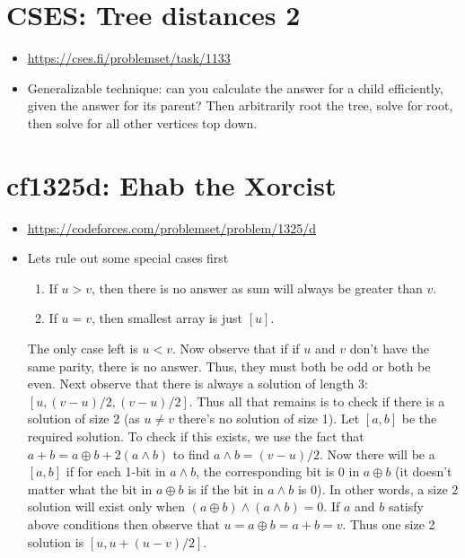 \documentclass[titlepage, 12pt]{book}
\begin{document}
\section{CSES: Tree distances 2}
\begin{itemize}
  \item \url{https://cses.fi/problemset/task/1133}
  \item Generalizable technique: can you calculate the answer for a child
    efficiently, given the answer for its parent? Then arbitrarily root the
    tree, solve for root, then solve for all other vertices top down.
\end{itemize}

\section{cf1325d: Ehab the Xorcist}
\begin{itemize}
  \item \url{https://codeforces.com/problemset/problem/1325/d}
  \item Lets rule out some special cases first
    \begin{enumerate}
      \item If $u > v$, then there is no answer as sum will always be greater
        than $v$.
      \item If $u = v$, then smallest array is just $[u]$.
    \end{enumerate}
    The only case left is $u < v$. Now observe that if if $u$ and $v$ don't have
    the same parity, there is no answer. Thus, they must both be odd or both be
    even. Next observe that there is always a solution of length 3: $[u, (v - u)
    / 2, (v - u) / 2]$. Thus all that remains is to check if there is a solution
    of size 2 (as $u\neq v$ there's no solution of size 1). Let $[a, b]$ be the
    required solution. To check if this exists, we use the fact that $a + b =
    a\oplus b + 2(a \land b)$ to find $a\land b = (v - u) / 2$. Now there will
    be a $[a, b]$ if for each 1-bit in $a\land b$, the corresponding bit is 0 in
    $a\oplus b$ (it doesn't matter what the bit in $a\oplus b$ is if the bit in
    $a\land b$ is 0). In other words, a size 2 solution will exist only when
    $(a\oplus b)\land (a\land b) = 0$. If $a$ and $b$ satisfy above conditions
    then observe that $u = a\oplus b = a + b = v$. Thus one size 2 solution is
    $[u, u + (u - v) / 2]$.
\end{itemize}
\end{document}
